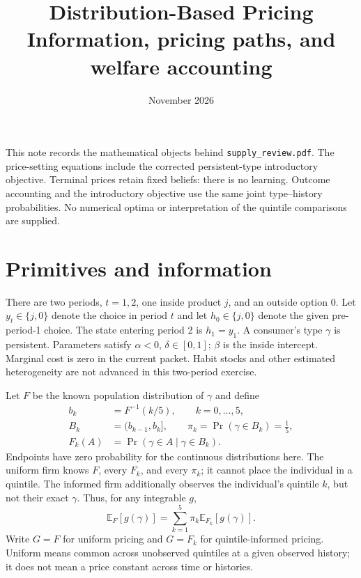 \documentclass[11pt]{article}
\title{Distribution-Based Pricing\\\large Information, pricing paths, and welfare accounting}
\author{}\date{November 2026}
\newcommand{\E}{\mathbb{E}}
\begin{document}
\maketitle
\vspace{-2em}
This note records the mathematical objects behind \texttt{supply\_review.pdf}.
The price-setting equations include the corrected persistent-type introductory
objective. Terminal prices retain fixed beliefs: there is no learning.
Outcome accounting and the introductory objective use the same joint
type--history probabilities. No numerical
optima or interpretation of the quintile comparisons are supplied.

\section{Primitives and information}
There are two periods, $t=1,2$, one inside product $j$, and an outside option
$0$. Let $y_t\in\{j,0\}$ denote the choice in period $t$ and let
$h_0\in\{j,0\}$ denote the given pre-period-1 choice. The state entering
period 2 is $h_1=y_1$. A consumer's type $\gamma$ is persistent.
Parameters satisfy $\alpha<0$, $\delta\in[0,1]$; $\beta$ is the inside
intercept. Marginal cost is zero in the current packet. Habit stocks and
other estimated heterogeneity are not advanced in this two-period exercise.

Let $F$ be the known population distribution of $\gamma$ and define
\begin{align}
 b_k&=F^{-1}(k/5),\qquad k=0,\ldots,5,\\
 B_k&=(b_{k-1},b_k],\qquad
 \pi_k=\Pr(\gamma\in B_k)=\tfrac15,\\
 F_k(A)&=\Pr(\gamma\in A\mid\gamma\in B_k).
\end{align}
Endpoints have zero probability for the continuous distributions here.
The uniform firm knows $F$, every $F_k$, and every $\pi_k$; it cannot place
the individual in a quintile. The informed firm additionally observes the
individual's quintile $k$, but not their exact $\gamma$.
Thus, for any integrable $g$,
\begin{equation}
 \boxed{\E_F[g(\gamma)]
 =\sum_{k=1}^5\pi_k\E_{F_k}[g(\gamma)].}
 \label{eq:mixture}
\end{equation}
Write $G=F$ for uniform pricing and $G=F_k$ for quintile-informed pricing.
Uniform means common across unobserved quintiles at a given observed
history; it does not mean a price constant across time or histories.
\end{document}
